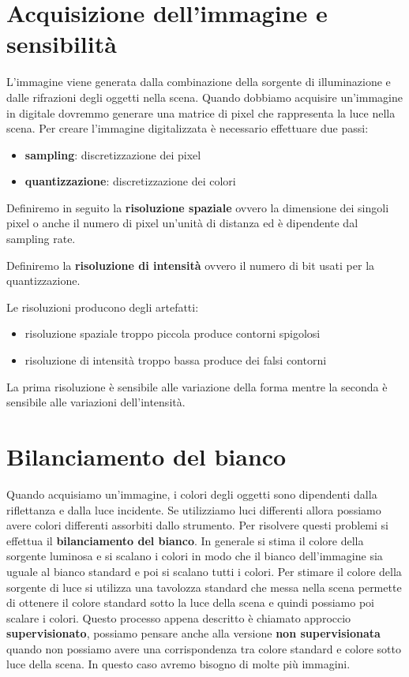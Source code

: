 \section{Acquisizione dell'immagine e sensibilità}
L'immagine viene generata dalla combinazione della sorgente di illuminazione e
dalle rifrazioni degli oggetti nella scena. Quando dobbiamo acquisire un'immagine
in digitale dovremmo generare una matrice di pixel che rappresenta la luce nella
scena. Per creare l'immagine digitalizzata è necessario effettuare due passi:
\begin{itemize}
    \item \textbf{sampling}: discretizzazione dei pixel
    \item \textbf{quantizzazione}: discretizzazione dei colori
\end{itemize}

Definiremo in seguito la \textbf{risoluzione spaziale} ovvero la dimensione dei
singoli pixel o anche il numero di pixel un'unità di distanza ed è dipendente dal
sampling rate.

Definiremo la \textbf{risoluzione di intensità} ovvero il numero di bit usati per
la quantizzazione.

Le risoluzioni producono degli artefatti:
\begin{itemize}
    \item risoluzione spaziale troppo piccola produce contorni spigolosi
    \item risoluzione di intensità troppo bassa produce dei falsi contorni
\end{itemize}

La prima risoluzione è sensibile alle variazione della forma mentre la seconda è
sensibile alle variazioni dell'intensità.

\section{Bilanciamento del bianco}
Quando acquisiamo un'immagine, i colori degli oggetti sono dipendenti dalla riflettanza 
e dalla luce incidente. Se utilizziamo luci differenti allora possiamo avere 
colori differenti assorbiti dallo strumento. Per risolvere questi problemi si 
effettua il \textbf{bilanciamento del bianco}. In generale si stima il colore 
della sorgente luminosa e si scalano i colori in modo che il bianco dell'immagine 
sia uguale al bianco standard e poi si scalano tutti i colori. Per stimare il colore
della sorgente di luce si utilizza una tavolozza standard che messa nella scena 
permette di ottenere il colore standard sotto la luce della scena e quindi possiamo 
poi scalare i colori. Questo processo appena descritto è chiamato approccio \textbf{supervisionato},
possiamo pensare anche alla versione \textbf{non supervisionata} quando non possiamo 
avere una corrispondenza tra colore standard e colore sotto luce della scena. In 
questo caso avremo bisogno di molte più immagini.


